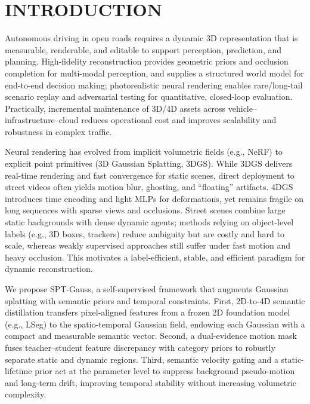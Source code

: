 \documentclass{IEEEoj}
\begin{document}
\maketitle

\section{INTRODUCTION}
Autonomous driving in open roads requires a dynamic 3D representation that is measurable, renderable, and editable to support perception, prediction, and planning. High-fidelity reconstruction provides geometric priors and occlusion completion for multi-modal perception, and supplies a structured world model for end-to-end decision making; photorealistic neural rendering enables rare/long-tail scenario replay and adversarial testing for quantitative, closed-loop evaluation. Practically, incremental maintenance of 3D/4D assets across vehicle–infrastructure–cloud reduces operational cost and improves scalability and robustness in complex traffic.

Neural rendering has evolved from implicit volumetric fields (e.g., NeRF) to explicit point primitives (3D Gaussian Splatting, 3DGS). While 3DGS delivers real-time rendering and fast convergence for static scenes, direct deployment to street videos often yields motion blur, ghosting, and “floating” artifacts. 4DGS introduces time encoding and light MLPs for deformations, yet remains fragile on long sequences with sparse views and occlusions. Street scenes combine large static backgrounds with dense dynamic agents; methods relying on object-level labels (e.g., 3D boxes, trackers) reduce ambiguity but are costly and hard to scale, whereas weakly supervised approaches still suffer under fast motion and heavy occlusion. This motivates a label-efficient, stable, and efficient paradigm for dynamic reconstruction.

We propose SPT-Gauss, a self-supervised framework that augments Gaussian splatting with semantic priors and temporal constraints. First, 2D-to-4D semantic distillation transfers pixel-aligned features from a frozen 2D foundation model (e.g., LSeg) to the spatio-temporal Gaussian field, endowing each Gaussian with a compact and measurable semantic vector. Second, a dual-evidence motion mask fuses teacher–student feature discrepancy with category priors to robustly separate static and dynamic regions. Third, semantic velocity gating and a static-lifetime prior act at the parameter level to suppress background pseudo-motion and long-term drift, improving temporal stability without increasing volumetric complexity.
\end{document}
